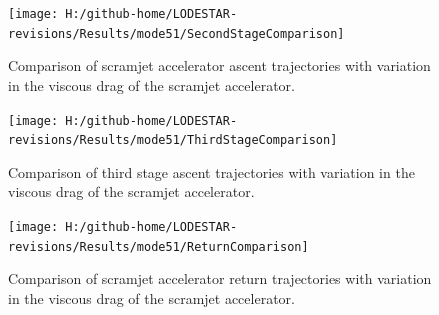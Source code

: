 \begin{figure}[!th]
\centering
\texttt{[image: H:/github-home/LODESTAR-revisions/Results/mode51/SecondStageComparison]}
\caption{Comparison of scramjet accelerator ascent trajectories with variation in the viscous drag of the scramjet accelerator.}
\label{fig:SecondStageComparison-}
\end{figure}
\begin{figure}[!th]
\centering
\texttt{[image: H:/github-home/LODESTAR-revisions/Results/mode51/ThirdStageComparison]}
\caption{Comparison of third stage ascent trajectories with variation in the viscous drag of the scramjet accelerator.}
\label{fig:ThirdStageComparison-}
\end{figure}


\begin{figure}[!th]
	\centering
	\texttt{[image: H:/github-home/LODESTAR-revisions/Results/mode51/ReturnComparison]}
	\caption{Comparison of scramjet accelerator return trajectories with variation in the viscous drag of the scramjet accelerator.}
	\label{fig:ReturnComparison-}
\end{figure}
